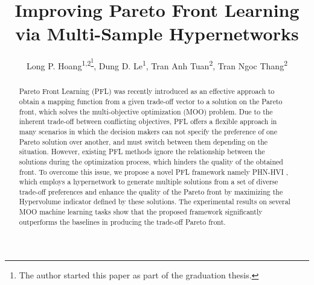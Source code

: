 \documentclass[letterpaper]{article} %
\title{Improving Pareto Front Learning via Multi-Sample Hypernetworks}
\author {
Long P. Hoang\textsuperscript{\rm 1,\rm 2\footnote{The author started this paper as part of the graduation thesis.}},
Dung D. Le\textsuperscript{\rm 1},
Tran Anh Tuan\textsuperscript{\rm 2},
Tran Ngoc Thang\textsuperscript{\rm 2}
}
\newcommand{\ourmodel}{PHN-HVI }
\begin{document}
\maketitle


\begin{abstract}
Pareto Front Learning (PFL) was recently introduced as an effective approach to obtain a mapping function from a given trade-off vector to a solution on the Pareto front, which solves the multi-objective optimization (MOO) problem. Due to the inherent trade-off between conflicting objectives, PFL offers a flexible approach in many scenarios in which the decision makers can not specify the preference of one Pareto solution over another, and must switch between them depending on the situation. However, existing PFL methods ignore the relationship between the solutions during the optimization process, which hinders the quality of the obtained front. To overcome this issue, we propose a novel PFL framework namely \ourmodel, which employs a hypernetwork to generate multiple solutions from a set of diverse trade-off preferences and enhance the quality of the Pareto front by maximizing the Hypervolume indicator defined by these solutions. The experimental results on several MOO machine learning tasks show that the proposed framework significantly outperforms the baselines in producing the trade-off Pareto front.
\end{abstract}
\end{document}
